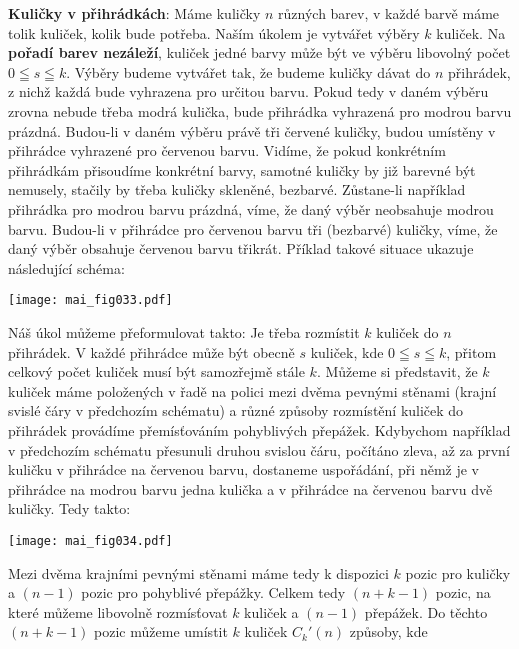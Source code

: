 \begin{example}\label{mai:exam009}
  \textbf{Kuličky v přihrádkách}:\newline
  Máme kuličky \(n\) různých barev, v každé barvě máme tolik kuliček, kolik bude potřeba. Naším 
  úkolem je vytvářet výběry \(k\) kuliček. Na \textbf{pořadí barev nezáleží}, kuliček jedné barvy 
  může být ve výběru libovolný počet \(0\leqq s \leqq k\). Výběry budeme vytvářet tak, že budeme 
  kuličky dávat do \(n\) přihrádek, z nichž každá bude vyhrazena pro určitou barvu. Pokud tedy v 
  daném výběru zrovna nebude třeba modrá kulička, bude přihrádka vyhrazená pro modrou barvu 
  prázdná. Budou-li v daném výběru právě tři červené kuličky, budou umístěny v přihrádce vyhrazené 
  pro červenou barvu. Vidíme, že pokud konkrétním přihrádkám přisoudíme konkrétní barvy, samotné 
  kuličky by již barevné být nemusely, stačily by třeba kuličky skleněné, bezbarvé. Zůstane-li 
  například přihrádka pro modrou barvu prázdná, víme, že daný výběr neobsahuje modrou barvu. 
  Budou-li v přihrádce pro červenou barvu tři (bezbarvé) kuličky, víme, že daný výběr obsahuje 
  červenou barvu třikrát. Příklad takové situace ukazuje následující schéma:
  
  {\centering
    \texttt{[image: mai\_fig033.pdf]}
    \par}

  Náš úkol můžeme přeformulovat takto: Je třeba rozmístit \(k\) kuliček do \(n\) přihrádek. V každé 
  přihrádce může být obecně \(s\) kuliček, kde \(0\leqq s \leqq k\), přitom celkový počet kuliček 
  musí být samozřejmě stále \(k\). Můžeme si představit, že \(k\) kuliček máme položených v řadě na 
  polici mezi dvěma pevnými stěnami (krajní svislé čáry v předchozím schématu) a různé způsoby 
  rozmístění kuliček do přihrádek provádíme přemísťováním pohyblivých přepážek. Kdybychom například 
  v předchozím schématu přesunuli druhou svislou čáru, počítáno zleva, až za první kuličku v 
  přihrádce na červenou barvu, dostaneme uspořádání, při němž je v přihrádce na modrou barvu jedna 
  kulička a v přihrádce na červenou barvu dvě kuličky. Tedy takto:

  {\centering
    \texttt{[image: mai\_fig034.pdf]}
    \par}

  Mezi dvěma krajními pevnými stěnami máme tedy k dispozici \(k\) pozic pro kuličky a \((n - 1)\) 
  pozic pro pohyblivé přepážky. Celkem tedy \((n + k - 1)\) pozic, na které můžeme libovolně 
  rozmísťovat \(k\) kuliček a \((n - 1)\) přepážek. Do těchto \((n + k - 1)\) pozic můžeme umístit 
  \(k\) kuliček \(C_k'(n)\) způsoby, kde
  

\end{example}

